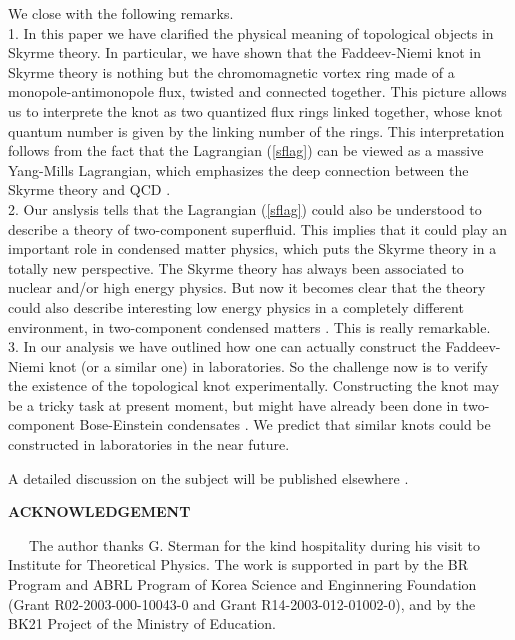 \documentclass[twocolumn,showpacs,showkeys]{revtex4}
\begin{document}
We close with the following remarks. \\
1. In this paper we have clarified the physical meaning
of topological objects in Skyrme theory.
In particular, we have shown that
the Faddeev-Niemi knot in Skyrme theory is
nothing but the chromomagnetic vortex ring made of
a monopole-antimonopole flux, twisted and
connected together. This picture allows us to interprete
the knot as two quantized flux rings linked together,
whose knot quantum number is given by the linking number
of the rings. This interpretation
follows from the fact that the Lagrangian (\ref{sflag})
can be viewed as a massive Yang-Mills Lagrangian, which
emphasizes the deep connection between the Skyrme theory
and QCD \cite{cho02}.  \\
2. Our anslysis tells that the Lagrangian (\ref{sflag})
could also be understood to describe a theory of two-component
superfluid. This implies that it could
play an important role in condensed matter physics,
which puts the Skyrme theory
in a totally new perspective.
The Skyrme theory has always
been associated to nuclear and/or high energy physics.
But now it becomes clear
that the theory could also describe interesting low energy physics
in a completely different environment,
in two-component condensed matters
\cite{cho1,cho2}. This is really remarkable. \\
3. In our analysis we have outlined
how one can actually construct the
Faddeev-Niemi knot (or a similar one) in laboratories.
So the challenge now is to verify the existence of the topological
knot experimentally. Constructing the knot may be a tricky task 
at present moment, but might have already been done 
in two-component Bose-Einstein condensates \cite{exp2,exp3}.
We predict that similar knots could be constructed 
in laboratories in the near future.

 A detailed discussion on the subject will be published 
elsewhere \cite{sky3}.

{\bf ACKNOWLEDGEMENT}

~~~The author thanks G. Sterman for the kind hospitality during
his visit to Institute for Theoretical Physics. 
The work is supported in part by the BR 
Program and ABRL Program of Korea Science and Enginnering 
Foundation (Grant R02-2003-000-10043-0
and Grant R14-2003-012-01002-0), and by the BK21 Project of 
the Ministry of Education.
\end{document}
